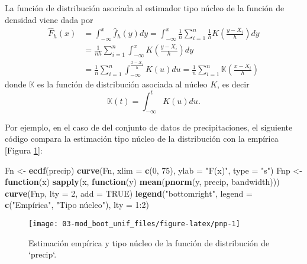 \documentclass[]{book}
\newenvironment{Shaded}{\begin{snugshade}}{\end{snugshade}}
\newcommand{\KeywordTok}[1]{\textcolor[rgb]{0.13,0.29,0.53}{\textbf{#1}}}
\newcommand{\DataTypeTok}[1]{\textcolor[rgb]{0.13,0.29,0.53}{#1}}
\newcommand{\DecValTok}[1]{\textcolor[rgb]{0.00,0.00,0.81}{#1}}
\newcommand{\StringTok}[1]{\textcolor[rgb]{0.31,0.60,0.02}{#1}}
\newcommand{\OtherTok}[1]{\textcolor[rgb]{0.56,0.35,0.01}{#1}}
\newcommand{\ControlFlowTok}[1]{\textcolor[rgb]{0.13,0.29,0.53}{\textbf{#1}}}
\newcommand{\NormalTok}[1]{#1}
\theoremstyle{break}
\theoremstyle{definition}
\theoremstyle{definition}
\theoremstyle{definition}
\theoremstyle{remark}
\begin{document}
La función de distribución asociada al estimador tipo núcleo de la
función de densidad viene dada por \[\begin{aligned}
\hat{F}_{h}\left( x \right) &= \int_{-\infty }^{x}\hat{f}_{h}\left( y \right) dy
=\int_{-\infty }^{x}\frac{1}{n}\sum_{i=1}^{n}\frac{1}{h}
K\left( \frac{y-X_i}{h} \right) dy \\
&= \frac{1}{nh}\sum_{i=1}^{n}\int_{-\infty }^{x}
K\left( \frac{y-X_i}{h} \right) dy \\
&= \frac{1}{n}\sum_{i=1}^{n}\int_{-\infty }^{\frac{x-X_i}{h}}K\left( u \right) du
=\frac{1}{n}\sum_{i=1}^{n}\mathbb{K}\left( \frac{x-X_i}{h} \right)
\end{aligned}\] donde \(\mathbb{K}\) es la función de distribución
asociada al núcleo \(K\), es decir
\[\mathbb{K}\left( t \right) =\int_{-\infty }^{t}K\left(
u \right) du.\]

Por ejemplo, en el caso de del conjunto de datos de precipitaciones, el
siguiente código compara la estimación tipo núcleo de la distribución
con la empírica {[}Figura \ref{fig:pnp}{]}:

\begin{Shaded}
\begin{Highlighting}[]
\NormalTok{Fn <-}\StringTok{ }\KeywordTok{ecdf}\NormalTok{(precip)}
\KeywordTok{curve}\NormalTok{(Fn, }\DataTypeTok{xlim =} \KeywordTok{c}\NormalTok{(}\DecValTok{0}\NormalTok{, }\DecValTok{75}\NormalTok{), }\DataTypeTok{ylab =} \StringTok{"F(x)"}\NormalTok{, }\DataTypeTok{type =} \StringTok{"s"}\NormalTok{)}
\NormalTok{Fnp <-}\StringTok{ }\ControlFlowTok{function}\NormalTok{(x) }\KeywordTok{sapply}\NormalTok{(x, }\ControlFlowTok{function}\NormalTok{(y) }\KeywordTok{mean}\NormalTok{(}\KeywordTok{pnorm}\NormalTok{(y, precip, bandwidth)))}
\KeywordTok{curve}\NormalTok{(Fnp, }\DataTypeTok{lty =} \DecValTok{2}\NormalTok{, }\DataTypeTok{add =} \OtherTok{TRUE}\NormalTok{) }
\KeywordTok{legend}\NormalTok{(}\StringTok{"bottomright"}\NormalTok{, }\DataTypeTok{legend =} \KeywordTok{c}\NormalTok{(}\StringTok{"Empírica"}\NormalTok{, }\StringTok{"Tipo núcleo"), lty = 1:2)}
\end{Highlighting}
\end{Shaded}

\begin{figure}[!htb]

{\centering \texttt{[image: 03-mod\_boot\_unif\_files/figure-latex/pnp-1]} 

}

\caption{Estimación empírica y tipo núcleo de la función de distribución de `precip`. }\label{fig:pnp}
\end{figure}
\end{document}
